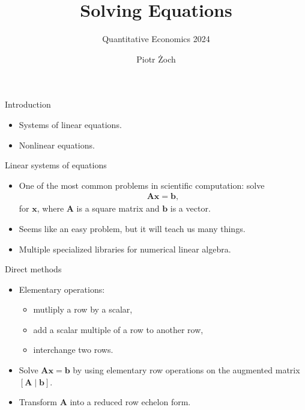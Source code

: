 \documentclass[11pt,xcolor={dvipsnames},aspectratio=159,hyperref={pdftex,pdfpagemode=UseNone,hidelinks,pdfdisplaydoctitle=true},usepdftitle=false]{beamer}
\begin{document}
\title{Solving Equations}
\subtitle{Quantitative Economics 2024}

\author{Piotr Żoch}%
\frame{\titlepage}

\begin{frame}{Introduction}   
\begin{itemize}
    \item Systems of linear equations.
    \item Nonlinear equations.
\end{itemize}
\end{frame}


\begin{frame}
    \end{frame}

\begin{frame}{Linear systems of equations}
    \begin{itemize}
        \item One of the most common problems in scientific computation: solve  
\begin{align*}
    \mathbf{A}\mathbf{x} = \mathbf{b},
\end{align*}
for $\mathbf{x}$, where $\mathbf{A}$ is a square matrix and $\mathbf{b}$ is a vector.
    \item Seems like an easy problem, but it will teach us many things.
    \item Multiple specialized libraries for numerical linear algebra.
\end{itemize}
\end{frame}

\begin{frame}{Direct methods}
    \begin{itemize}
        \item Elementary operations: 
        \begin{itemize}
            \item mutliply a row by a scalar,
            \item add a scalar multiple of a row to another row,
            \item interchange two rows. 
        \end{itemize}
        \item Solve $\mathbf{A}\mathbf{x} = \mathbf{b}$ by using elementary row operations on the augmented matrix $[\mathbf{A}\mid\mathbf{b}]$.
        \item Transform $\mathbf{A}$ into a reduced row echelon form. 
    \end{itemize}
    \end{frame}
\end{document}
